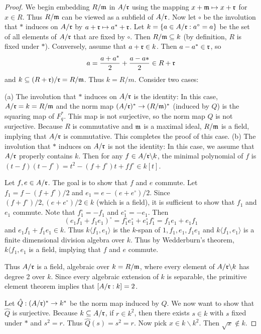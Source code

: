 \begin{proof}
We begin embedding $R/\mathfrak{m}$ in $A/\mathfrak{r}$ using the mapping $x + \mathfrak{m} \mapsto x + \mathfrak{r}$ for $x \in R$.
Thus $R/\mathfrak{m}$ can be viewed as a subfield of $A/\mathfrak{r}$.
Now let $\circ$ be the involution that $*$ induces on $A/\mathfrak{r}$ by $a + \mathfrak{r} \mapsto a^* + \mathfrak{r}$.
Let $k = \{a \in A/\mathfrak{r} : a^\circ = a \}$ be the set of all elements of $A/\mathfrak{r}$ that are fixed by $\circ$.
Then $R/\mathfrak{m} \subseteq k$ (by definition, $R$ is fixed under $*$).
Conversely, assume that $a + \mathfrak{r} \in k$.
Then $a - a^* \in \mathfrak{r}$, so
\[
a = \frac{a + a^*}{2} + \frac{a - a*}{2} \in R + \mathfrak{r}
\]
and $k \subseteq (R + \mathfrak{r})/\mathfrak{r} = R/\mathfrak{m}$. Thus $k = R/m$.
Consider two cases:

(a) The involution that $*$ induces on $A/\mathfrak{r}$ is the identity: In this case, $A/\mathfrak{r} = k = R/\mathfrak{m}$ and the norm map $(A/\mathfrak{r})^* \to (R/\mathfrak{m})^*$ (induced by $Q$) is the squaring map of $F_q^*$.
This map is not surjective, so the norm map $Q$ is not surjective.
Because $R$ is commutative and $\mathfrak{m}$ is a maximal ideal, $R/\mathfrak{m}$ is a field, implying that $A/\mathfrak{r}$ is commutative.
This completes the proof of this case.
(b) The involution that $*$ induces on $A/\mathfrak{r}$ is not the identity: In this case, we assume that $A/\mathfrak{r}$ properly contains $k$.
Then for any $f \in A/\mathfrak{r} \backslash k$, the minimal polynomial of $f$ is $(t - f)(t - f^\circ) = t^2 - (f + f^\circ)t + f f^\circ \in k[t]$.

Let $f, e \in A/\mathfrak{r}$.
The goal is to show that $f$ and $e$ commute.
Let $f_1 = f - (f + f^\circ) / 2$ and $e_1 = e - (e + e^\circ) / 2$.
Since $(f + f^\circ)/2, (e + e^\circ)/2 \in k$ (which is a field), it is sufficient to show that $f_1$ and $e_1$ commute.
Note that $f_1^\circ = -f_1$ and $e_1^\circ = -e_1$.
Then
\[
(e_1 f_1 + f_1 e_1)^\circ = f_1^\circ e_1^\circ + e_1^\circ f_1^\circ = f_1 e_1 + e_1 f_1
\]
and $e_1 f_1 + f_1 e_1 \in k$.
Thus $k\langle f_1, e_1 \rangle$ is the $k$-span of $1, f_1, e_1, f_1 e_1$ and $k \langle f_1, e_1 \rangle$ is a finite dimensional division algebra over $k$.
Thus by Wedderburn's theorem, $k \langle f_1, e_1$ is a field, implying that $f$ and $e$ commute.

Thus $A/\mathfrak{r}$ is a field, algebraic over $k = R/\mathfrak{m}$, where every element of $A/\mathfrak{r} \backslash k$ has degree 2 over $k$.
Since every algebraic extension of $k$ is separable, the primitive element theorem implies that $[A/\mathfrak{r} : k] = 2$.

Let $\hat{Q}: (A/\mathfrak{r})^* \to k^*$ be the norm map induced by $Q$.
We now want to show that $\hat{Q}$ is surjective.
Because $k \subseteq A/\mathfrak{r}$, if $r \in k^2$, then there exists $s \in k$ with $s$ fixed under $*$ and $s^2 = r$.
Thus $\hat{Q}(s) = s^2 = r$.
Now pick $x \in k \backslash k^2$.
Then $\sqrt{x} \not\in k$.


\end{proof}
